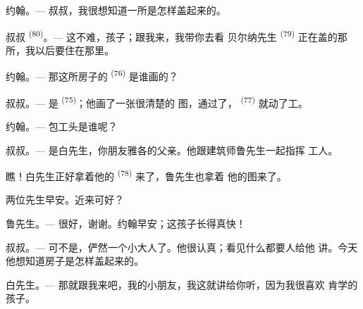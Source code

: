 %
%

\VUsaut{6.0mm}
\VUsaut{1.4mm}
\VUsaut{2.2mm}

\VUsaut{3.0mm}

\textsc{约翰}。--- 叔叔，我很想知道一所是怎样盖起来的。

\textsc{叔叔} \textsuperscript{(80)}。--- 这不难，孩子；跟我来，我带你去看
贝尔纳先生 \textsuperscript{(79)} 正在盖的那所，我以后要住在那里。

\textsc{约翰}。--- 那这所房子的 \textsuperscript{(76)} 是谁画的？

\textsc{叔叔}。--- 是 \textsuperscript{(75)}；他画了一张很清楚的
图，通过了， \textsuperscript{(77)} 就动了工。

\textsc{约翰}。--- 包工头是谁呢？

\textsc{叔叔}。--- 是白先生，你朋友雅各的父亲。他跟建筑师鲁先生一起指挥
工人。

瞧！白先生正好拿着他的 \textsuperscript{(78)} 来了，鲁先生也拿着
他的图来了。

两位先生早安。近来可好？

\textsc{鲁先生}。--- 很好，谢谢。约翰早安；这孩子长得真快！

\textsc{叔叔}。--- 可不是，俨然一个小大人了。他很认真；看见什么都要人给他
讲。今天他想知道房子是怎样盖起来的。

\VUsaut{3.0mm}

\textsc{白先生}。--- 那就跟我来吧，我的小朋友，我这就讲给你听，因为我很喜欢
肯学的孩子。

